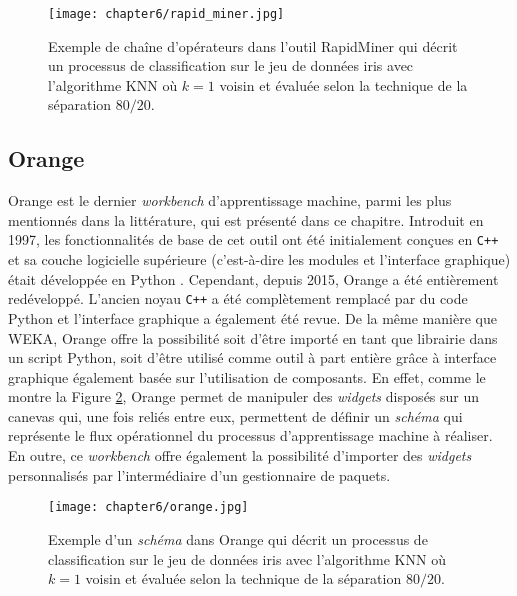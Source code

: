 \begin{figure}[H]
	\centering
	\texttt{[image: chapter6/rapid\_miner.jpg]}
        \caption{Exemple de chaîne d'opérateurs dans l'outil RapidMiner qui décrit un processus de classification sur le jeu de données iris avec l'algorithme \acs{KNN} où $k=1$ voisin et évaluée selon la technique de la séparation $80/20$.}
	\label{fig:rapid_miner}
\end{figure}

\subsection{Orange}

Orange est le dernier \textit{workbench} d'apprentissage machine, parmi les plus mentionnés dans la littérature, qui est présenté dans ce chapitre. Introduit en 1997, les fonctionnalités de base de cet outil ont été initialement conçues en \verb!C++! et sa couche logicielle supérieure (c'est-à-dire les modules et l'interface graphique) était développée en Python \citep{Demsar2004,Demsar2013}. Cependant, depuis 2015, Orange a été entièrement redéveloppé. L'ancien noyau \verb!C++! a été complètement remplacé par du code Python et l'interface graphique a également été revue. De la même manière que \acs{WEKA}, Orange offre la possibilité soit d'être importé en tant que librairie dans un script Python, soit d'être utilisé comme outil à part entière grâce à interface graphique également basée sur l'utilisation de composants. En effet, comme le montre la Figure \ref{fig:orange}, Orange permet de manipuler des \emph{widgets} disposés sur un canevas qui, une fois reliés entre eux, permettent de définir un \emph{schéma} qui représente le flux opérationnel du processus d'apprentissage machine à réaliser. En outre, ce \textit{workbench} offre également la possibilité d'importer des \emph{widgets} personnalisés par l'intermédiaire d'un gestionnaire de paquets.

\begin{figure}[H]
	\centering
	\texttt{[image: chapter6/orange.jpg]}
        \caption{Exemple d'un \emph{schéma} dans Orange qui décrit un processus de classification sur le jeu de données iris avec l'algorithme \acs{KNN} où $k=1$ voisin et évaluée selon la technique de la séparation $80/20$.}
	\label{fig:orange}
\end{figure}

